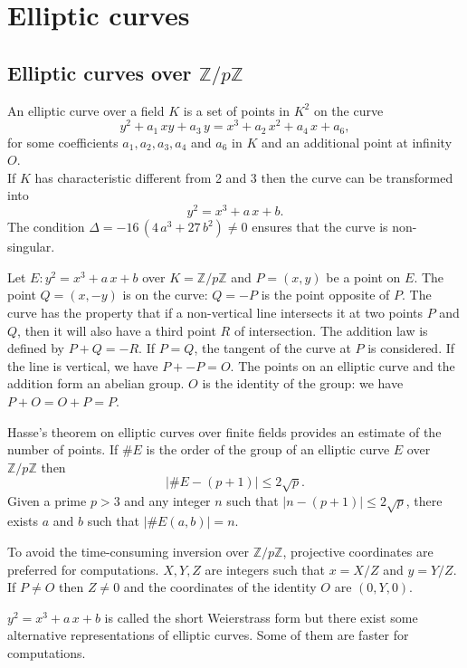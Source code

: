 \documentclass[a4paper, 11pt, pdftex]{report}
\theoremstyle{plain}
\theoremstyle{definition}
\begin{document}
\chapter{Elliptic curves}

\section{Elliptic curves over $\mathbb{Z}/p\mathbb{Z}$}

An elliptic curve over a field $K$ is a set of points in $K^2$ on the curve
$$y^2 + a_1\, x y + a_3\, y = x^3 + a_2\, x^2 + a_4\, x + a_6,$$
for some coefficients $a_1, a_2, a_3, a_4$ and $a_6$ in $K$ and an additional point at infinity $O$.\\
If $K$ has characteristic different from 2 and 3 then the curve can be transformed into
$$y^2 = x^3 + a\,x + b.$$
The condition $\Delta = -16\,(4\,a^3 + 27\,b^2) \neq 0$ ensures that the curve is non-singular.

Let $E: y^2 = x^3 + a\,x + b$ over $K = \mathbb{Z}/p\mathbb{Z}$ and $P = (x, y)$ be
a point on $E$. The point $Q = (x, -y)$ is on the curve: $Q = -P$ is the point opposite of $P$.
The curve has the property that if a non-vertical line intersects it at two points $P$ and $Q$,
then it will also have a third point $R$ of intersection. The addition law is defined
by $P + Q = -R$. If $P = Q$, the tangent of the curve at $P$ is considered.
If the line is vertical, we have $P + -P = O$.
The points on an elliptic curve and the addition form an abelian group.
$O$ is the identity of the group: we have $P + O = O + P = P$.

Hasse's theorem on elliptic curves over finite fields provides an estimate of the number of
points. If $\#E$ is the order of the group of an elliptic curve $E$ over $\mathbb{Z}/p\mathbb{Z}$
then
$$|\#E - (p + 1) | \le 2\sqrt{p}.$$
Given a prime $p > 3$ and any integer $n$ such that $|n - (p + 1)| \le 2\sqrt{p}$, there exists
$a$ and $b$ such that $|\#E(a, b)| = n$.

To avoid the time-consuming inversion over $\mathbb{Z}/p\mathbb{Z}$, projective coordinates
are preferred for computations. $X, Y, Z$ are integers such that $x = X/Z$ and $y = Y/Z$.
If $P \neq O$ then $Z \neq 0$ and the coordinates of the identity $O$ are $(0, Y, 0)$.

$y^2 = x^3 + a\,x + b$ is called the short Weierstrass form but there exist
some alternative representations of elliptic curves. Some of them are faster for computations.
\end{document}
